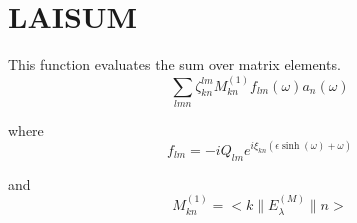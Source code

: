 \section{LAISUM}
\label{sect:laisum}

\noindent This function evaluates the sum over matrix elements.\\

\begin{equation}
\sum_{lmn} \zeta^{lm}_{kn}  M^{(1)}_{kn} f_{lm}(\omega) a_n(\omega)
\end{equation}

\noindent where\\

\begin{equation}
f_{lm} = -i Q_{lm} e^{i \xi_{kn} (\epsilon \sinh(\omega) + \omega)}
\end{equation}

\noindent and\\

\begin{equation}
M^{(1)}_{kn} = <k \parallel E^{(M)}_\lambda \parallel n>
\end{equation}


